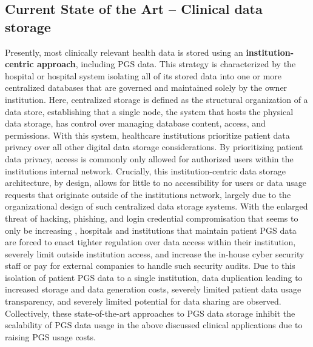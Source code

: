 \documentclass[runningheads]{llncs}
\begin{document}

\subsection{Current State of the Art -- Clinical data storage}
Presently, most clinically relevant health data is stored using an \textbf{institution-centric approach}, including PGS data. 
This strategy is characterized by the hospital or hospital system isolating all of its stored data into one or more centralized databases that are governed and maintained solely by the owner institution. 
Here, centralized storage is defined as the structural organization of a data store, establishing that a single node, the system that hosts the physical data storage, has control over managing database content, access, and permissions. 
With this system, healthcare institutions prioritize patient data privacy over all other digital data storage considerations. 
By prioritizing patient data privacy, access is commonly only allowed for authorized users within the institution\textquotesingle s internal network. 
Crucially, this institution-centric data storage architecture, by design, allows for little to no accessibility for users or data usage requests that originate outside of the institution\textquotesingle s network, largely due to the organizational design of such centralized data storage systems. 
With the enlarged threat of hacking, phishing, and login credential compromisation that seems to only be increasing \cite{noauthor_ransomware_nodate}, hospitals and institutions that maintain patient PGS data are forced to enact tighter regulation over data access within their institution, severely limit outside institution access, and increase the in-house cyber security staff or pay for external companies to handle such security audits.  
Due to this isolation of patient PGS data to a single institution, data duplication leading to increased storage and data generation costs, severely limited patient data usage transparency, and severely limited potential for data sharing are observed. 
Collectively, these state-of-the-art approaches to PGS data storage inhibit the scalability of PGS data usage in the above discussed clinical applications due to raising PGS usage costs.
\end{document}
